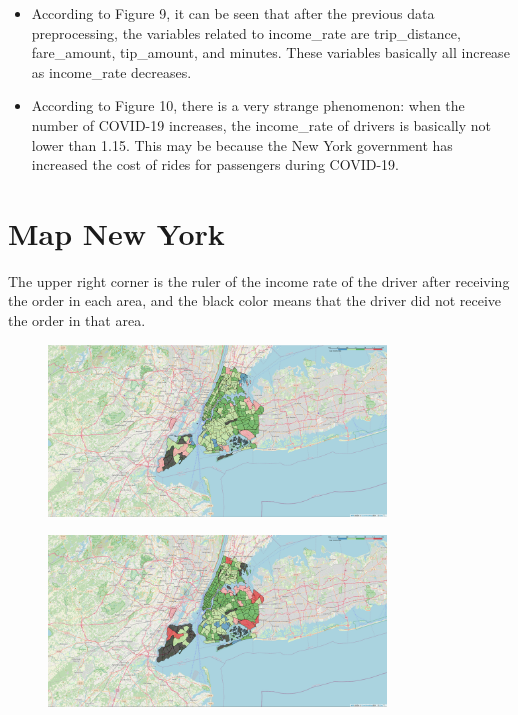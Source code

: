 \documentclass[11pt]{article}
\begin{document}
\begin{itemize}
    \item According to Figure 9, it can be seen that after the previous data preprocessing, the variables related to income\_rate are trip\_distance, fare\_amount, tip\_amount, and minutes. These variables basically all increase as income\_rate decreases.
\end{itemize}
\begin{itemize}
    \item According to Figure 10, there is a very strange phenomenon: when the number of COVID-19 increases, the income\_rate of drivers is basically not lower than 1.15. This may be because the New York government has increased the cost of rides for passengers during COVID-19.
\end{itemize}
\section{Map New York}
The upper right corner is the ruler of the income rate of the driver after receiving the order in each area, and the black color means that the driver did not receive the order in that area.
\begin{figure}[H]
    \centering
    \includegraphics[width=0.8\textwidth]{plots/12-01.PNG}
    \caption{}
    \label{fig:my_label}
\end{figure}
\begin{figure}[H]
    \centering
    \includegraphics[width=0.8\textwidth]{plots/2.PNG}
    \caption{}
    \label{fig:my_label}
\end{figure}
\end{document}
